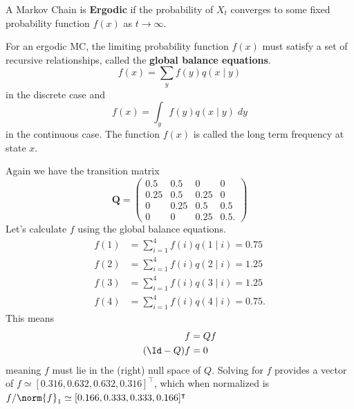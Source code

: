 \begin{defe} \label{defe: erogic_markov_chain}
    A Markov Chain is {\bf Ergodic} if the probability of $X_t$ converges to some fixed probability function $f(x)$ as $t \to \infty$.
\end{defe}

\begin{defe} \label{defe: gbe}
    For an ergodic MC, the limiting probability function $f(x)$ must satisfy a set of recursive relationships, called the {\bf global balance equations}.
    \[
        f(x) = \sum_{y} f(y) q \left( x \mid y \right)
    \]
    in the discrete case and
    \[
        f(x) = \int_y f(y) q(x \mid y) \; dy
    \]
    in the continuous case. The function $f(x)$ is called the long term frequency at state $x$.
\end{defe}

\begin{exam} \label{exam: mc_state_intro_cont_1}
    Again we have the transition matrix
    \begin{equation*}
        \bm{Q} =
        \begin{pmatrix}
            0.5  & 0.5  & 0    & 0     \\
            0.25 & 0.5  & 0.25 & 0     \\
            0    & 0.25 & 0.5  & 0.5   \\
            0    & 0    & 0.25 & 0.5 .
        \end{pmatrix}
    \end{equation*}
    Let's calculate $f$ using the global balance equations.
    \begin{align*}
        f(1) & = \sum_{i=1}^4 f(i) q(1 \mid i) = 0.75  \\
        f(2) & = \sum_{i=1}^4 f(i) q(2 \mid i) = 1.25  \\
        f(3) & = \sum_{i=1}^4 f(i) q(3 \mid i) = 1.25  \\
        f(4) & = \sum_{i=1}^4 f(i) q(4 \mid i) = 0.75.
    \end{align*}
    This means
    \begin{align*}
        f           & = Q f \\
        (\Id - Q) f & = 0
    \end{align*}
    meaning $f$ must lie in the (right) null space of $Q$. Solving for $f$ provides a vector of $f \simeq [0.316, 0.632, 0.632, 0.316]^{\intercal}$, which when normalized is $f / \norm{f}_1 \simeq [0.166 , 0.333 , 0.333 , 0.166]^{\intercal}$
\end{exam}

